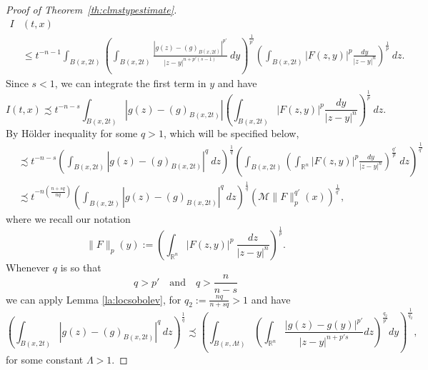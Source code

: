 \documentclass[12pt]{amsart}
\theoremstyle{definition}
\newcommand{\R}{\mathbb{R}}
\newcommand{\brac}[1]{\left (#1 \right )}
\numberwithin{theorem}{section} \numberwithin{equation}{section}
\newcommand{\aleq}{\precsim}
\begin{document}
\begin{proof}[Proof of Theorem~\ref{th:clmstypestimate}]
\[\begin{split}
 I&(t,x) \\
 &\leq  t^{-n-1} \int_{B(x,2t)}\brac{\int_{B(x,2t)}\frac{|g(z)-(g)_{B(x,2t)}|^{p'}}{|z-y|^{n+p'(s-1)}}\ dy}^{\frac{1}{p'}} \brac{\int_{B(x,2t)} |F(z,y)|^{p}\frac{dy}{|z-y|^n}}^{\frac{1}{p}} \ dz.
\end{split}
 \]
Since $s < 1$, we can integrate the first term in $y$ and have
\begin{equation}\label{ineq:I}
 I(t,x)\aleq t^{-n-s} \int_{B(x,2t)}|g(z)-(g)_{B(x,2t)}| \brac{\int_{B(x,2t)} |F(z,y)|^{p}\frac{dy}{|z-y|^n} }^{\frac{1}{p}}\ dz.
\end{equation}
By H\"older inequality for some $q>1$, which will be specified below,
\begin{align}
 &\aleq t^{-n-s} \brac{\int_{B(x,2t)}|g(z)-(g)_{B(x,2t)}|^q \ dz}^{\frac{1}{q}} \brac{\int_{B(x,2t)} \brac{\int_{\R^n} |F(z,y)|^{p}\frac{dy}{|z-y|^n} }^{\frac{q'}{p}}\ dz }^{\frac{1}{q'}}\nonumber\\
 &\aleq t^{-n (\frac{n+sq}{nq})} \brac{\int_{B(x,2t)}|g(z)-(g)_{B(x,2t)}|^q\ dz}^{\frac{1}{q}} \brac{\mathcal{M} \|F\|_{p}^{q'}(x)}^{\frac{1}{q'}}\nonumber,
 \end{align}
where we recall our notation
\[
 \|F\|_{p}(y) := \brac{\int_{\R^n} |F(z,y)|^{p}\ \frac{dz}{|z-y|^n}}^{\frac{1}{p}}. 
\]
Whenever $q$ is so that
\begin{equation}\label{eq:qconds}
 q>p'\quad \mbox{and}\quad q>\frac{n}{n-s}
\end{equation}
we can apply Lemma \ref{la:locsobolev}, for $q_2 := \frac{nq}{n+sq} > 1$ and have
\[
 \brac{\int_{B(x,2t)} |g(z)-(g)_{B(x,2t)}|^{q}\,dz}^{\frac{1}{q}} \aleq \brac{\int_{B(x,\Lambda t)} \brac{\int_{\R^n} \frac{|g(z)-g(y)|^{p'}}{|z-y|^{n+p' s}} dz }^{\frac{q_2}{p'}}dy}^{\frac{1}{q_2}},
\]
for some constant $\Lambda > 1$.


\end{proof}
\end{document}
